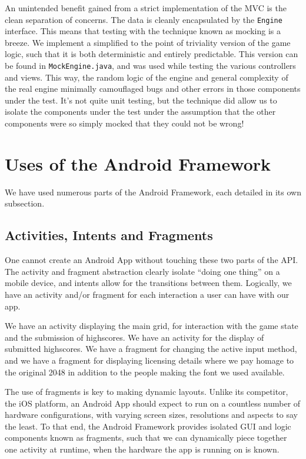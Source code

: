 \documentclass[a4paper, 12pt]{article}
\newcommand{\code}[1]{\texttt{#1}}
\begin{document}
An unintended benefit gained from a strict implementation of the MVC
is the clean separation of concerns. The data is cleanly encapsulated
by the \code{Engine} interface. This means that testing with the
technique known as mocking is a breeze. We implement a simplified to
the point of triviality version of the game logic, such that it is
both deterministic and entirely predictable. This version can be found
in \code{MockEngine.java}, and was used while testing the various
controllers and views. This way, the random logic of the engine and
general complexity of the real engine minimally camouflaged bugs and
other errors in those components under the test. It's not quite unit
testing, but the technique did allow us to isolate the components
under the test under the assumption that the other components were so
simply mocked that they could not be wrong!

\section{Uses of the Android Framework}

We have used numerous parts of the Android Framework, each detailed in
its own subsection.

\subsection{Activities, Intents and Fragments}
One cannot create an Android App without touching these two parts of
the API. The activity and fragment abstraction clearly isolate ``doing
one thing'' on a mobile device, and intents allow for the transitions
between them. Logically, we have an activity and/or fragment for each
interaction a user can have with our app.

We have an activity displaying the main grid, for interaction with the
game state and the submission of highscores. We have an activity for
the display of submitted highscores. We have a fragment for changing
the active input method, and we have a fragment for displaying
licensing details where we pay homage to the original 2048 in addition
to the people making the font we used available.

The use of fragments is key to making dynamic layouts. Unlike its
competitor, the iOS platform, an Android App should expect to run on a
countless number of hardware configurations, with varying screen
sizes, resolutions and aspects to say the least. To that end, the
Android Framework provides isolated GUI and logic components known as
fragments, such that we can dynamically piece together one activity at
runtime, when the hardware the app is running on is known.
\end{document}
